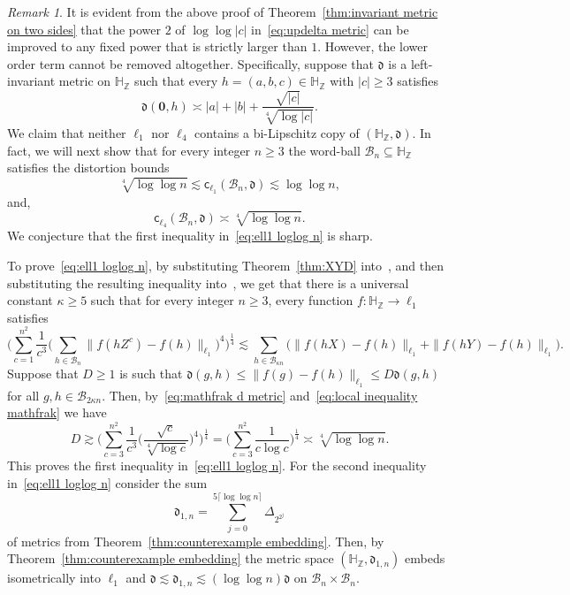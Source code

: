 \documentclass[11pt,reqno]{amsart}
\renewcommand{\H}{\mathbb{H}}
\newcommand{\Z}{\mathbb{Z}}
\newcommand{\cc}{{\mathsf{c}}}
\newcommand{\0}{\mathbf{0}}
\renewcommand{\1}{\mathbf 1}
\renewcommand{\subset}{\subseteq}
\renewcommand{\ge}{\geqslant}
\renewcommand{\le}{\leqslant}
\theoremstyle{remark}
\newtheorem{remark}[thm]{Remark}
\begin{document}
\begin{remark}\label{rem:lower order term needed} It is evident from the above proof of Theorem~\ref{thm:invariant metric on two sides} that the power $2$ of $\log\log |c|$ in~\eqref{eq:updelta metric} can be improved to any fixed power that is strictly larger than $1$. However, the lower order term cannot be removed altogether. Specifically, suppose that $\mathfrak{d}$ is a left-invariant metric on $\H_\Z$ such that  every $h=(a,b,c)\in \H_\Z$ with $|c|\ge 3$ satisfies
\begin{equation}\label{eq:mathfrak d metric}
\mathfrak{d}(\0,h)\asymp |a|+|b|+\frac{\sqrt{|c|}}{\sqrt[4]{\log|c|}}.
\end{equation}
We claim that neither $\ell_1$ nor $\ell_4$ contains a bi-Lipschitz copy of $(\H_\Z,\mathfrak{d})$. In fact, we will next show that for every integer $n\ge 3$ the word-ball $\mathcal{B}_n\subset \H_\Z$ satisfies the distortion bounds
\begin{equation}\label{eq:ell1 loglog n}
\sqrt[4]{\log\log n}\lesssim \cc_{\ell_1}(\mathcal{B}_n,\mathfrak{d})\lesssim\log\log n,
\end{equation}
and,
\begin{equation}\label{eq:ell4 loglog n}
\cc_{\ell_4}(\mathcal{B}_n,\mathfrak{d})\asymp \sqrt[4]{\log\log n}.
\end{equation}
We conjecture that the first inequality in~\eqref{eq:ell1 loglog n} is sharp.

To prove~\eqref{eq:ell1 loglog n}, by substituting Theorem~\ref{thm:XYD} into~\cite[Lemma~33]{NY18}, and then substituting the resulting inequality into~\cite[Lemma~30]{NY18}, we get that there is a universal constant $\kappa\ge 5$ such that for every integer $n\ge 3$, every function $f:\H_\Z\to \ell_1$ satisfies
\begin{equation}\label{eq:local inequality mathfrak}
\bigg(\sum_{c=1}^{n^2} \frac{1}{c^3} \Big( \sum_{h\in \mathcal{B}_n} \|f(hZ^c)-f(h)\|_{\ell_1} \Big)^4\bigg)^{\frac14} \lesssim
\sum_{h\in \mathcal{B}_{\kappa n}} \big( \|f(hX)-f(h)\|_{\ell_1}+\|f(hY)-f(h)\|_{\ell_1}\big).
\end{equation}
Suppose that $D\ge 1$ is such that $\mathfrak{d}(g,h)\le \|f(g)-f(h)\|_{\ell_1}\le D\mathfrak{d}(g,h)$ for all $g,h\in \mathcal{B}_{2\kappa n}$. Then, by~\eqref{eq:mathfrak d metric} and~\eqref{eq:local inequality mathfrak} we have
\begin{equation}\label{eq:D log log}
D\gtrsim \bigg(\sum_{c=3}^{n^2} \frac{1}{c^3} \Big( \frac{\sqrt{c}}{\sqrt[4]{\log c}} \Big)^4\bigg)^{\frac14}=\bigg(\sum_{c=3}^{n^2} \frac{1}{c\log c} \bigg)^{\frac14}\asymp\sqrt[4]{\log\log n}.
\end{equation}
This proves the first inequality in~\eqref{eq:ell1 loglog n}. For the second inequality in~\eqref{eq:ell1 loglog n} consider the sum
$$
\mathfrak{d}_{1,n}= \sum_{j=0}^{5\lceil \log\log n\rceil}\Delta_{2^{2^j}}
$$
of metrics from Theorem~\ref{thm:counterexample embedding}. Then, by Theorem~\ref{thm:counterexample embedding} the metric space $(\H_\Z,\mathfrak{d}_{1,n})$ embeds isometrically into $\ell_1$ and $\mathfrak{d}\lesssim \mathfrak{d}_{1,n} \lesssim (\log\log n)\mathfrak{d}$ on $\mathcal{B}_n\times \mathcal{B}_n$.


\end{remark}
\end{document}
